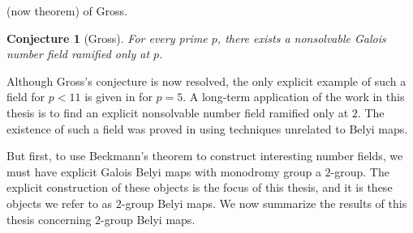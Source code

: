 \documentclass{dcthesis}
\newcommand{\defi}[1]{\textsf{#1}}
\numberwithin{equation}{section}
\newtheorem{conj}[equation]{Conjecture}
\theoremstyle{definition}
\theoremstyle{remark}
\begin{document}
{{{    (now theorem) of Gross.
    \begin{conj}[Gross]
      \label{conj:gross}
      For every prime $p$,
      there exists a nonsolvable Galois
      number field
      ramified only at $p$.
    \end{conj}
    Although Gross's conjecture is now resolved,
    the only explicit example of such
    a field for $p<11$ is given
    in \cite{roberts5} for $p=5$.
    A long-term application of the work
    in this thesis is to
    find an explicit nonsolvable number field
    ramified only at $2$.
    The existence of such a field was proved
    in \cite{lassina} using techniques
    unrelated to Belyi maps.
    \par
    But first, to use Beckmann's theorem
    to construct interesting number fields,
    we must have explicit
    Galois Belyi maps with monodromy group
    a $2$-group.
    The explicit construction of these
    objects is the focus of this thesis,
    and it is these objects we refer to as
    \defi{$2$-group Belyi maps}.
    We now summarize the results of this thesis
    concerning
    $2$-group Belyi maps.
  }
}}
\end{document}
